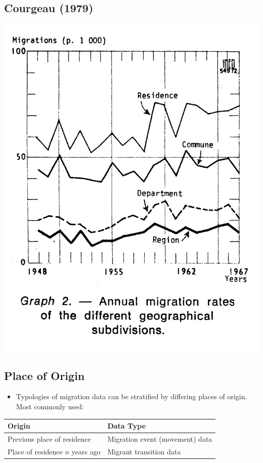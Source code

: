 \documentclass[
]{book}
\providecommand{\tightlist}{%
  \setlength{\itemsep}{0pt}\setlength{\parskip}{0pt}}
\begin{document}
\hypertarget{courgeau-1979}{%
\subsection{Courgeau (1979)}\label{courgeau-1979}}

\includegraphics[width=0.5\linewidth]{img/courgeau-1979-area}

\hypertarget{place-of-origin}{%
\subsection{Place of Origin}\label{place-of-origin}}

\begin{itemize}
\tightlist
\item
  Typologies of migration data can be stratified by differing places of origin. Most commonly used:
\end{itemize}

\begin{longtable}[]{@{}ll@{}}
\toprule
Origin & Data Type \\
\midrule
\endhead
Previous place of residence & Migration event (movement) data \\
Place of residence \(n\) years ago & Migrant transition data \\
\bottomrule
\end{longtable}
\end{document}
